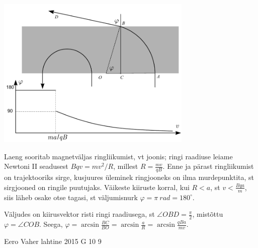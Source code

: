 \documentclass[11pt, twoside]{article}
\begin{document}
{{\ifSolution
\begin{center}
\includegraphics[width=0.7\textwidth]{2015-v2g-09-magnetvalilah}
\end{center}
Laeng sooritab magnetväljas ringliikumist, vt joonis;
ringi raadiuse leiame Newtoni II seadusest $Bqv=mv^2/R$, millest
$R=\frac{mv}{qB}$. Enne ja pärast ringliikumist on trajektooriks sirge, kusjuures üleminek ringjooneks on ilma murdepunktita, st sirgjooned on ringile puutujaks. Väikeste kiiruste korral, kui $R<a$, st $v<\frac{Bqa}{m}$, siis läheb osake otse tagasi,
st väljumisnurk $\varphi=\pi \SI{}{rad}=180^\circ$.

Väljudes on kiirusvektor risti ringi raadiusega, st $\angle OBD=\frac \pi 2$, mistõttu $\varphi=\angle COB$. Seega, $\varphi=\arcsin \frac{BC}{BO}=\arcsin \frac{a}{R}=\arcsin \frac{qBa}{mv}$.
\fi
}

{Eero Vaher} %
{lahtine} %
{2015} %
{G 10} %
{9} %
{

}}
\end{document}
